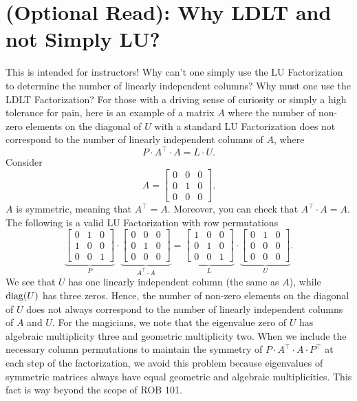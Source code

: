 \section{(Optional Read): Why LDLT and not Simply LU?}
\label{sec:WhyLDLT}
 This is intended for instructors! Why can't one simply use the LU Factorization to determine the number of linearly independent columns? Why must one use the LDLT Factorization? For those with a driving sense of curiosity or simply a high tolerance for pain, here is an example of a matrix $A$ where the number of non-zero elements on the diagonal of $U$ with a standard LU Factorization does not correspond to the number of linearly independent columns of $A$, where
$$P \cdot A^\top \cdot A = L \cdot U. $$
Consider
$$A=\left[
\begin{array}{ccc}
0 & 0 & 0\\
0 & 1 & 0\\
0 & 0 & 0
\end{array}
\right]. $$
$A$ is symmetric, meaning that $A^\top = A$. Moreover, you can check that $A^\top \cdot A = A$. The following is a valid LU Factorization with row permutations
$$ \underbrace{\left[
\begin{array}{ccc}
0 & 1 & 0\\
1 & 0 & 0\\
0 & 0 & 1
\end{array}
\right]}_{P} \cdot \underbrace{\left[
\begin{array}{ccc}
0 & 0 & 0\\
0 & 1 & 0\\
0 & 0 & 0
\end{array}
\right]}_{A^\top \cdot A} = \underbrace{\left[
\begin{array}{ccc}
1 & 0 & 0\\
0 & 1 & 0\\
0 & 0 & 1
\end{array}
\right]}_{L} \cdot  \underbrace{\left[ \begin{array}{ccc}
\boxed{0} & 1 & 0\\
0 & \boxed{0} & 0\\
0 & 0 & \boxed{0}
\end{array}
\right]}_{U}. $$
We see that $U$ has one linearly independent column (the same as $A$), while ${\rm diag}(U)$ has three zeros. Hence, the number of non-zero elements on the diagonal of $U$ does not always correspond to the number of linearly independent columns of $A$ and $U$. For the magicians, we note that the eigenvalue zero of $U$ has algebraic multiplicity three and geometric multiplicity two. When we include the necessary column permutations to maintain the symmetry of $P \cdot A^\top \cdot A \cdot P^\top$ at each step of the factorization, we avoid this problem because eigenvalues of symmetric matrices always have equal geometric and algebraic multiplicities. This fact is way beyond the scope of ROB 101.
\Qed

